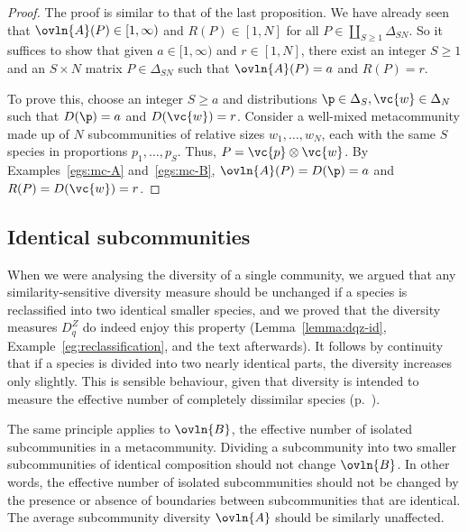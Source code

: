 \begin{proof}
The proof is similar to that of the last proposition.  We have already seen
that $\ovln{A}(P) \in [1, \infty)$ and $R(P) \in [1, N]$ for all $P \in
  \coprod_{S \geq 1} \Delta_{SN}$.  So it suffices to show that given $a
  \in [1, \infty)$ and $r \in [1, N]$, there exist an integer $S \geq 1$
  and an $S \times N$ matrix $P \in \Delta_{SN}$ such that $\ovln{A}(P) =
  a$ and $R(P) = r$.

To prove this, choose an integer $S \geq a$ and distributions $\p \in
\Delta_S, \vc{w} \in \Delta_N$ such that $D(\p) = a$ and $D(\vc{w}) = r$.
Consider a well-mixed metacommunity made up of $N$ subcommunities of
relative sizes $w_1, \ldots, w_N$, each with the same $S$ species in
proportions $p_1, \ldots, p_S$.  Thus, $P = \vc{p} \otimes \vc{w}$.  
By Examples~\ref{egs:mc-A}
and~\ref{egs:mc-B}, $\ovln{A}(P) = D(\p) = a$ and $R(P) =
D(\vc{w}) = r$.
\end{proof}


\subsection*{Identical subcommunities}


When we were analysing the diversity of a single community, we argued that
any similarity-sensitive diversity measure should be unchanged if a species
is reclassified into two identical smaller species, and we proved that the
diversity measures $D_q^Z$ do indeed enjoy this property
(Lemma~\ref{lemma:dqz-id}, Example~\ref{eg:reclassification}, and the text
afterwards).  It follows by continuity that if a species is divided
into two nearly identical parts, the diversity increases only slightly.
This is sensible behaviour, given that diversity is intended to measure the
effective number of completely dissimilar species (p.~\pageref{p:en-cd}).

The same principle applies to $\ovln{B}$, the effective%
%
%
%  
number of isolated subcommunities in a metacommunity.  Dividing a
subcommunity into two smaller subcommunities of identical composition
should not change $\ovln{B}$.  In other words, the effective number of
isolated subcommunities should not be changed by the presence or absence of
boundaries between subcommunities that are identical.  The average
subcommunity diversity $\ovln{A}$ should be similarly unaffected.

